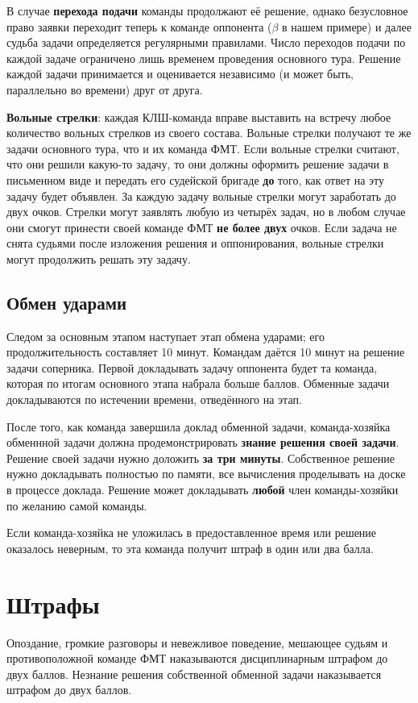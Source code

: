 \documentclass[12pt,a4paper]{article}
\begin{document}
В случае \textbf{перехода подачи} команды продолжают её решение, однако безусловное право заявки переходит теперь к команде оппонента ($\beta$ в нашем примере) и далее судьба задачи определяется регулярными правилами. Число переходов подачи по каждой задаче ограничено лишь временем проведения основного тура. Решение каждой задачи принимается и оценивается независимо (и может быть, параллельно во времени) друг от друга.

{\bf Вольные стрелки}: каждая КЛШ-команда вправе выставить на встречу любое количество вольных стрелков из своего состава. Вольные стрелки получают те же задачи основного тура, что и их команда ФМТ. Если вольные стрелки считают, что они решили какую-то задачу, то они должны оформить решение задачи в письменном виде и передать его судейской бригаде \textbf{до} того, как ответ на эту задачу будет объявлен. За каждую задачу вольные стрелки могут заработать до двух очков. Стрелки могут заявлять любую из четырёх задач, но в любом случае они смогут принести своей команде ФМТ \textbf{не более двух} очков. Если задача не снята судьями после изложения решения и оппонирования, вольные стрелки могут продолжить решать эту задачу.

\subsection{Обмен ударами}
Следом за основным этапом наступает этап обмена ударами; его продолжительность составляет 10 минут. Командам даётся 10 минут на решение задачи соперника. Первой докладывать задачу оппонента будет та команда, которая по итогам основного этапа набрала больше баллов. Обменные задачи докладываются по истечении времени, отведённого на этап.

После того, как команда завершила доклад обменной задачи, команда-хозяйка обменнной задачи должна продемонстрировать \textbf{знание решения своей задачи}. Решение своей задачи нужно доложить \textbf{за три минуты}. Собственное решение нужно докладывать полностью по памяти, все вычисления проделывать на доске в процессе доклада. Решение может докладывать {\bf любой} член команды-хозяйки по желанию самой команды.

Если команда-хозяйка не уложилась в предоставленное время или решение оказалось неверным, то эта команда получит штраф в один или два балла.

\section{Штрафы}
Опоздание, громкие разговоры и невежливое поведение, мешающее судьям и противоположной команде ФМТ наказываются дисциплинарным штрафом до двух баллов. Незнание решения собственной обменной задачи наказывается штрафом до двух баллов.
\end{document}
